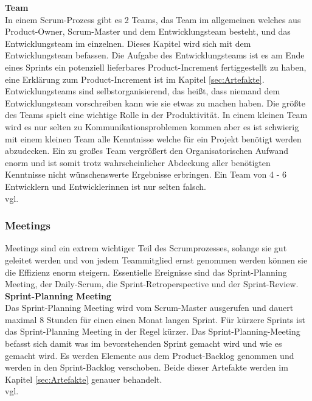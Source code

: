 			\textbf{Team} \\
			In einem Scrum-Prozess gibt es 2 Teams, das Team im allgemeinen welches aus Product-Owner, Scrum-Master und dem Entwicklungsteam besteht, und das Entwicklungsteam im einzelnen. Dieses Kapitel wird sich mit dem Entwicklungsteam befassen. Die Aufgabe des Entwicklungsteams ist es am Ende eines Sprints ein potenziell lieferbares Product-Increment fertiggestellt zu haben, eine Erklärung zum Product-Increment ist im Kapitel \ref{sec:Artefakte}. Entwicklungsteams sind selbstorganisierend, das heißt, dass niemand dem Entwicklungsteam vorschreiben kann wie sie etwas zu machen haben.
			Die größte des Teams spielt eine wichtige Rolle in der Produktivität. In einem kleinen Team wird es nur selten zu Kommunikationsproblemen kommen aber es ist schwierig mit einem kleinen Team alle Kenntnisse welche für ein Projekt benötigt werden abzudecken. Ein zu großes Team vergrößert den Organisatorischen Aufwand enorm und ist somit trotz wahrscheinlicher Abdeckung aller benötigten Kenntnisse nicht wünschenswerte Ergebnisse erbringen. Ein Team von 4 - 6 Entwicklern und Entwicklerinnen ist nur selten falsch.\\vgl. \textcite{ScrumTeam} \\
			
		
	\subsubsection{Meetings}
	\label{sec:Meetings}
		Meetings sind ein extrem wichtiger Teil des Scrumprozesses, solange sie gut geleitet werden und von jedem Teammitglied ernst genommen werden können sie die Effizienz enorm steigern. Essentielle Ereignisse sind das Sprint-Planning Meeting, der Daily-Scrum, die Sprint-Retroperspective und der Sprint-Review.  \\
		
		\textbf{Sprint-Planning Meeting} \\
		Das Sprint-Planning Meeting wird vom Scrum-Master ausgerufen und dauert maximal 8 Stunden für einen einen Monat langen Sprint. Für kürzere Sprints ist das Sprint-Planning Meeting in der Regel kürzer. Das Sprint-Planning-Meeting befasst sich damit was im bevorstehenden Sprint gemacht wird und wie es gemacht wird. Es werden Elemente aus dem Product-Backlog genommen und werden in den Sprint-Backlog verschoben. Beide dieser Artefakte werden im Kapitel \ref{sec:Artefakte} genauer behandelt.\\vgl. \textcite{ScrumSprint-Planning} \\
		
